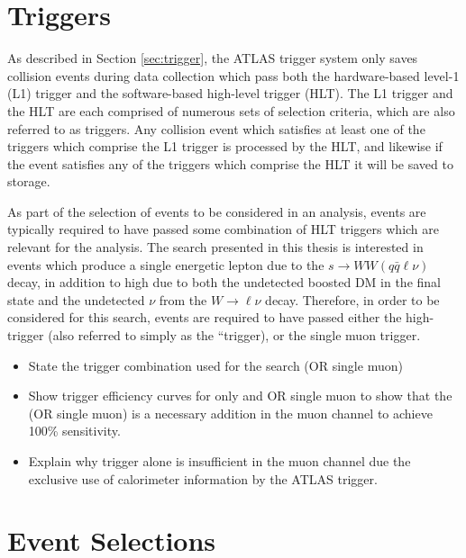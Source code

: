 \section{Triggers}
\label{sec:triggers_evt_selection}

As described in Section \ref{sec:trigger}, the ATLAS trigger system only saves collision events during data collection which pass both the hardware-based level-1 (L1) trigger and the software-based high-level trigger (HLT). The L1 trigger and the HLT are each comprised of numerous sets of selection criteria, which are also referred to as triggers. Any collision event which satisfies at least one of the triggers which comprise the L1 trigger is processed by the HLT, and likewise if the event satisfies any of the triggers which comprise the HLT it will be saved to storage.

As part of the selection of events to be considered in an analysis, events are typically required to have passed some combination of HLT triggers which are relevant for the analysis. The search presented in this thesis is interested in events which produce a single energetic lepton due to the \(s\rightarrow WW(q\bar{q}\ell\nu)\) decay, in addition to high \met due to both the undetected boosted DM in the final state and the undetected \(\nu\) from the \(W\rightarrow \ell\nu\) decay. Therefore, in order to be considered for this search, events are required to have passed either the high-\met trigger (also referred to simply as the ``\met trigger), or the single muon trigger. 

\begin{itemize}
\item State the trigger combination used for the search (\met OR single muon)
\item Show trigger efficiency curves for \met only and \met OR single muon to show that the (OR single muon) is a necessary addition in the muon channel to achieve 100\% sensitivity.
\item Explain why \met trigger alone is insufficient in the muon channel due the exclusive use of calorimeter information by the ATLAS \met trigger.
\end{itemize}

\section{Event Selections}
\label{sec:evt_selections}

